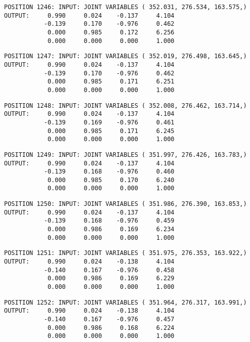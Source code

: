 \begin{verbatim}
POSITION 1246: INPUT: JOINT VARIABLES ( 352.031, 276.534, 163.575,)
OUTPUT:     0.990     0.024    -0.137     4.104
           -0.139     0.170    -0.976     0.462
            0.000     0.985     0.172     6.256
            0.000     0.000     0.000     1.000
\end{verbatim} \pagebreak[1]\begin{verbatim}
POSITION 1247: INPUT: JOINT VARIABLES ( 352.019, 276.498, 163.645,)
OUTPUT:     0.990     0.024    -0.137     4.104
           -0.139     0.170    -0.976     0.462
            0.000     0.985     0.171     6.251
            0.000     0.000     0.000     1.000
\end{verbatim} \pagebreak[1]\begin{verbatim}
POSITION 1248: INPUT: JOINT VARIABLES ( 352.008, 276.462, 163.714,)
OUTPUT:     0.990     0.024    -0.137     4.104
           -0.139     0.169    -0.976     0.461
            0.000     0.985     0.171     6.245
            0.000     0.000     0.000     1.000
\end{verbatim} \pagebreak[1]\begin{verbatim}
POSITION 1249: INPUT: JOINT VARIABLES ( 351.997, 276.426, 163.783,)
OUTPUT:     0.990     0.024    -0.137     4.104
           -0.139     0.168    -0.976     0.460
            0.000     0.985     0.170     6.240
            0.000     0.000     0.000     1.000
\end{verbatim} \pagebreak[1]\begin{verbatim}
POSITION 1250: INPUT: JOINT VARIABLES ( 351.986, 276.390, 163.853,)
OUTPUT:     0.990     0.024    -0.137     4.104
           -0.139     0.168    -0.976     0.459
            0.000     0.986     0.169     6.234
            0.000     0.000     0.000     1.000
\end{verbatim} \pagebreak[1]\begin{verbatim}
POSITION 1251: INPUT: JOINT VARIABLES ( 351.975, 276.353, 163.922,)
OUTPUT:     0.990     0.024    -0.138     4.104
           -0.140     0.167    -0.976     0.458
            0.000     0.986     0.169     6.229
            0.000     0.000     0.000     1.000
\end{verbatim} \pagebreak[1]\begin{verbatim}
POSITION 1252: INPUT: JOINT VARIABLES ( 351.964, 276.317, 163.991,)
OUTPUT:     0.990     0.024    -0.138     4.104
           -0.140     0.167    -0.976     0.457
            0.000     0.986     0.168     6.224
            0.000     0.000     0.000     1.000
\end{verbatim} \pagebreak[1]\begin{verbatim}

\end{verbatim}
